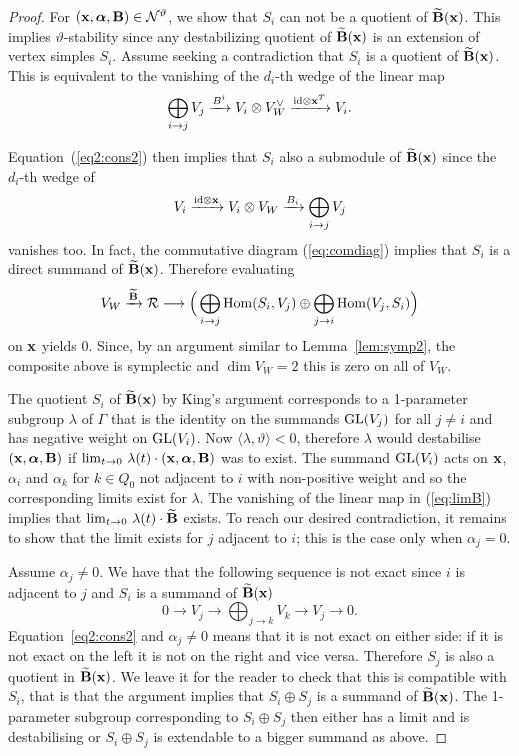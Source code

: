 \documentclass{amsart}
\newcommand{\balpha}{\boldsymbol{\alpha}}
\theoremstyle{definition}
\newcommand\VW{V_W}
\begin{document}
\begin{proof}
For $(\bfx, \balpha, \bfB) \in \cN^\vartheta$, we show that $S_i$ can not be a quotient of $\widetilde{\mathbf{B}}(\mathbf{x})$. This implies $\vartheta$-stability since any destabilizing quotient of $\widetilde{\mathbf{B}}(\mathbf{x})$ is an extension of vertex simples $S_i$.
Assume seeking a contradiction that $S_i$ is a quotient of $\widetilde{\mathbf{B}}(\mathbf{x})$.
This is equivalent to the vanishing of the $d_i$-th wedge of the linear map
$$\bigoplus_{i \rightarrow j} V_j \xrightarrow{B^i} V_i \otimes \VW^\vee \xrightarrow{\text{id} \otimes \bfx^T} V_i.$$

Equation~(\ref{eq2:cons2}) then implies that $S_i$ also a submodule of $\widetilde{\mathbf{B}}(\mathbf{x})$ since the $d_i$-th wedge of 
$$V_i \xrightarrow{\text{id} \otimes \bfx} V_i \otimes \VW \xrightarrow{B_i} \bigoplus_{i \rightarrow j} V_j$$
vanishes too.
In fact, the commutative diagram (\ref{eq:comdiag}) implies that $S_i$ is a direct summand of $\widetilde{\mathbf{B}}(\mathbf{x})$.
Therefore evaluating 
\begin{equation}\label{eq:limB}
\VW \xrightarrow{\widetilde{\bfB}} \cR \longrightarrow \Big(\bigoplus_{i \rightarrow j} \Hom(S_i,V_j) \oplus \bigoplus_{j \rightarrow i} \Hom(V_j, S_i)\Big)
\end{equation}
on $\mathbf{x}$ yields 0.
Since, by an argument similar to Lemma~\ref{lem:symp2}, the composite above is symplectic and $\dim \VW=2$ this is zero on all of $\VW$.

The quotient $S_i$ of $\widetilde{\mathbf{B}}(\mathbf{x})$ by King's argument corresponds to a 1-parameter subgroup $\lambda$ of $\Gamma$ that is the identity on the summands $\operatorname{GL}(V_j)$ for all $j\neq i$ and has negative weight on $\operatorname{GL}(V_i)$. 
Now $\langle \lambda, \vartheta\rangle <0$, therefore $\lambda$ would destabilise $(\bfx, \balpha, \bfB)$ if $\lim_{t \rightarrow 0} \, \lambda(t)\cdot (\bfx, \balpha, \bfB)$ was to exist.
The summand $\operatorname{GL}(V_i)$ acts on $\mathbf{x}$, $\alpha_i$ and $\alpha_k$ for $k \in Q_0$ not adjacent to $i$ with non-positive weight and so the corresponding limits exist for $\lambda$.
The vanishing of the linear map in (\ref{eq:limB}) implies that $\lim_{t \rightarrow 0}\, \lambda(t)\cdot \widetilde{\mathbf{B}}$ exists.
To reach our desired contradiction, it remains to show that the limit exists for $j$ adjacent to $i$; this is the case only when $\alpha_j=0$.

Assume $\alpha_j \neq 0$.
We have that the following sequence is not exact since $i$ is adjacent to $j$ and $S_i$ is a summand of $\widetilde{\mathbf{B}}(\mathbf{x})$
$$0 \longrightarrow V_j \longrightarrow \bigoplus_{j \rightarrow k} V_k \longrightarrow V_j \longrightarrow 0.$$
Equation~\eqref{eq2:cons2} and $\alpha_j \neq 0$ means that it is not exact on either side: if it is not exact on the left it is not on the right and vice versa.
Therefore $S_j$ is also a quotient in $\widetilde{\mathbf{B}}(\mathbf{x})$.
We leave it for the reader to check that this is compatible with $S_i$, that is that the argument implies that $S_i \oplus S_j$ is a summand of $\widetilde{\mathbf{B}}(\mathbf{x})$.
The 1-parameter subgroup corresponding to $S_i \oplus S_j$ then either has a limit and is destabilising or $S_i \oplus S_j$ is extendable to a bigger summand as above.
\end{proof}
\end{document}
